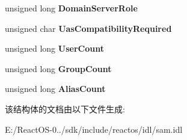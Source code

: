 \begin{DoxyCompactItemize}
\mbox{\label{struct___s_a_m_p_r___d_o_m_a_i_n___g_e_n_e_r_a_l___i_n_f_o_r_m_a_t_i_o_n_a58ab174b2598036814da7a1e22aa6e8c}} 
unsigned long {\bfseries Domain\+Server\+Role}
\item 
\mbox{\label{struct___s_a_m_p_r___d_o_m_a_i_n___g_e_n_e_r_a_l___i_n_f_o_r_m_a_t_i_o_n_a6665e1d0a904be6a18444c1e191feb3e}} 
unsigned char {\bfseries Uas\+Compatibility\+Required}
\item 
\mbox{\label{struct___s_a_m_p_r___d_o_m_a_i_n___g_e_n_e_r_a_l___i_n_f_o_r_m_a_t_i_o_n_a4a1654bf38d00f62fb89250a02928b09}} 
unsigned long {\bfseries User\+Count}
\item 
\mbox{\label{struct___s_a_m_p_r___d_o_m_a_i_n___g_e_n_e_r_a_l___i_n_f_o_r_m_a_t_i_o_n_acf7700f205aeade7f59cbc83ac9fa989}} 
unsigned long {\bfseries Group\+Count}
\item 
\mbox{\label{struct___s_a_m_p_r___d_o_m_a_i_n___g_e_n_e_r_a_l___i_n_f_o_r_m_a_t_i_o_n_a5e40d70c2e5b1fb9b4081dc1edbbe660}} 
unsigned long {\bfseries Alias\+Count}
\end{DoxyCompactItemize}


该结构体的文档由以下文件生成\+:\begin{DoxyCompactItemize}
\item 
E\+:/\+React\+O\+S-\/0../sdk/include/reactos/idl/sam.\+idl\end{DoxyCompactItemize}
